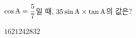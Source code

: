 $\cos\mathrm{A}=\dfrac{5}{7}$일 때, $35\sin\mathrm{A}\times\tan\mathrm{A}$의 값은? 
\begin{choices32}{$16$}{$21$}{$24$}{$28$}{$32$}\end{choices32}
